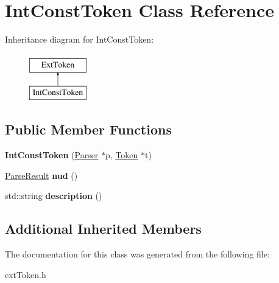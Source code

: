 \hypertarget{classIntConstToken}{\section{Int\-Const\-Token Class Reference}
\label{classIntConstToken}
}
Inheritance diagram for Int\-Const\-Token\-:\begin{figure}[H]
\begin{center}
\leavevmode
\includegraphics[height=2.000000cm]{classIntConstToken}
\end{center}
\end{figure}
\subsection*{Public Member Functions}
\begin{DoxyCompactItemize}
\item 
\hypertarget{classIntConstToken_a14c6bf0af5a915969b4fef1758067af3}{{\bfseries Int\-Const\-Token} (\hyperlink{classParser}{Parser} $\ast$p, \hyperlink{classToken}{Token} $\ast$t)}\label{classIntConstToken_a14c6bf0af5a915969b4fef1758067af3}

\item 
\hypertarget{classIntConstToken_ae1f720d6006c47e145cae7879d09c708}{\hyperlink{classParseResult}{Parse\-Result} {\bfseries nud} ()}\label{classIntConstToken_ae1f720d6006c47e145cae7879d09c708}

\item 
\hypertarget{classIntConstToken_a98191508d849878d40800e447a0f1892}{std\-::string {\bfseries description} ()}\label{classIntConstToken_a98191508d849878d40800e447a0f1892}

\end{DoxyCompactItemize}
\subsection*{Additional Inherited Members}


The documentation for this class was generated from the following file\-:\begin{DoxyCompactItemize}
\item 
ext\-Token.\-h\end{DoxyCompactItemize}
